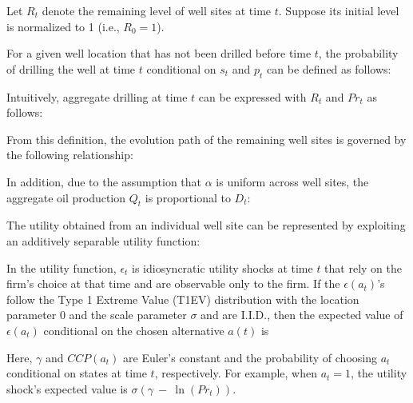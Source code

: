 Let $R_{t}$ denote the remaining level of well sites at time $t$. Suppose its initial level is normalized to 1 (i.e., $R_{0} = 1$).

For a given well location that has not been drilled before time $t$, the probability of drilling the well at time $t$ conditional on $s_{t}$ and $p_{t}$ can be defined as follows:


Intuitively, aggregate drilling at time $t$ can be expressed with $R_{t}$ and $Pr_{t}$ as follows:

From this definition, the evolution path of the remaining well sites is governed by the following relationship:

In addition, due to the assumption that $\alpha$ is uniform across well sites, the aggregate oil production $Q_{t}$ is proportional to $D_{t}$:


The utility obtained from an individual well site can be represented by exploiting an additively separable utility function:

In the utility function, $\epsilon_{t}$ is idiosyncratic utility shocks at time $t$ that rely on the firm's choice at that time and are observable only to the firm. If the $\epsilon(a_{t})$'s follow the Type 1 Extreme Value (T1EV) distribution with the location parameter 0 and the scale parameter $\sigma$ and are I.I.D., then the expected value of $\epsilon(a_{t})$ conditional on the chosen alternative $a(t)$ is

Here, $\gamma$ and $CCP(a_{t})$ are Euler's constant and the probability of choosing $a_{t}$ conditional on states at time $t$, respectively. For example, when $a_{t} = 1$, the utility shock's expected value is $\sigma \left( \gamma \ - \ \ln (Pr_{t}) \right)$. 
